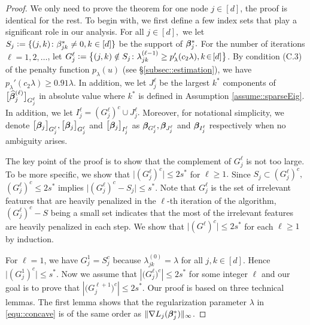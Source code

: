 \documentclass[twoside,11pt]{article}
\newcommand{\defeq}{\vcentcolon=}
\newcommand*{\hbbeta}{\hat{\bbeta}}
\newcommand*{\bbetas}{\bbeta^*}
\newcommand*{\gradstarss} {\nabla {L_j}(\bbeta^*_{j})}
\begin{document}
\begin{proof} 
We only need to  prove the theorem for one node $j\in [d]$, the proof is identical for the rest. 
To begin with, we first define a few index sets that play a significant role in our analysis.
For all $j\in[d],$ we let $ S_j\defeq  \{(j,k)\colon \beta_{jk}^* \neq 0, k\in[d]\}$ be the support of $\bbetas_j.$
For the number of iterations $\ell = 1,2,\ldots$, let $G_{j}^{\ell} \defeq \bigl \{(j,k) \notin S_j\colon \lambda_{jk}^{(\ell-1)} \geq p_{\lambda}'(c_2\lambda),k\!\in\![d]\bigr \} $.  By condition (C.3) of the penalty function $p_{\lambda}(u)$ (see \S\ref{subsec::estimation}), we have $p_{\lambda}'(c_2 \lambda) \geq 0.91\lambda.$ In addition, we let  $J_{j}^{\ell} $ be the largest  $k^*$ components of $\bigl[\hbbeta_{j}^{(\ell)}\bigr]_{G_{j}^{\ell}}$ in absolute value where $k^*$ is defined in Assumption \ref{assume::sparseEig}.
In addition, we let $I_{j}^\ell = ({G_{j}^\ell})^c \cup J_{j}^\ell.$  Moreover, for notational simplicity, we denote $\bigl[\bm{\beta}_j \bigr]_{G_j^\ell},\bigl[\bm{\beta}_j \bigr]_{G_j^\ell}$ and $\bigl[\bm{\beta}_j \bigr]_{I_j^\ell}$ as $\bm{\beta}_{G_j^\ell}, \bm{\beta}_{J_j^\ell}$ and $\bm{\beta}_{I_j^\ell}$ respectively when no ambiguity arises.

The key point of the proof is to show that the complement of $G_j^\ell$ is not too large. To be more specific, we show that $\bigl|(G_{j}^\ell)^c \bigr|\leq 2s^*$ for $\ell \geq 1.$ Since $S_j \subset (G_{j}^\ell)^c,$ $(G_{j}^\ell)^c \leq 2s^*$ implies  $\bigl| (G_{j}^\ell)^c - S_j \bigr| \leq s^*.$ Note that $G_j^\ell$ is the set of irrelevant features that are heavily penalized in the $\ell$-th iteration of the algorithm, $(G_{j}^\ell)^c - S$ being a small set indicates that the most of the irrelevant features are heavily penalized in each step. We show that $\bigl|(G^{\ell})^c\bigr| \leq 2s^*$ for each $\ell\geq 1$ by induction.
 
For $\ell=1$, we have $G_j^1 = S_j^c$ because $\lambda^{(0)}_{jk} = \lambda$ for all $j,k \in [d].$  Hence $\bigl |(G_j^1)^c\bigr|  \leq  s^*$. Now we assume that $|\bigl(G_j^{\ell}\bigr)^c| \leq 2s^*$  for some  integer $\ell$ and our goal is to prove that  $|\bigl(G_j^{\ell+1}\bigr)^c |\leq 2s^*. $  Our proof is based on three technical lemmas.  The first lemma shows that the regularization parameter $\lambda$ in \eqref{equ::concave} is of the same order as $\|\gradstarss\|_{\infty}$.


\end{proof}
\end{document}
